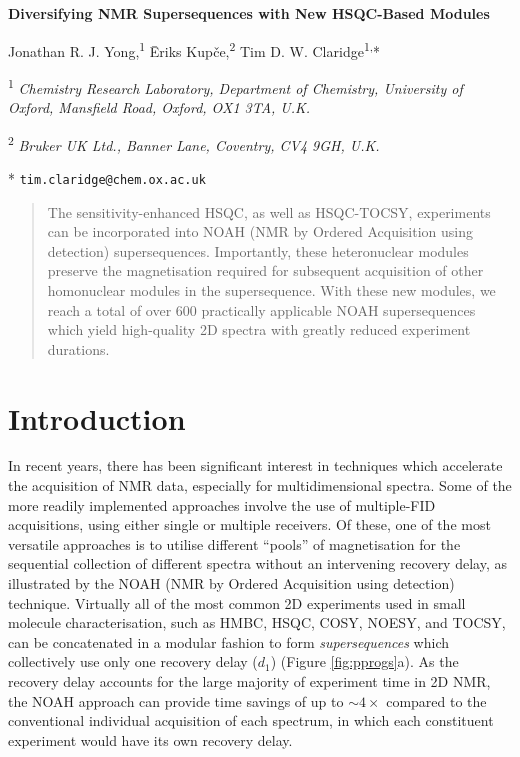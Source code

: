 \documentclass[11pt]{article}
\newcommand*{\proton}{\ce{^{1}H}}
\newcommand*{\figref}[1]{Figure \ref{fig:#1}}
\begin{document}
\begin{center}
    \Large \textbf{Diversifying NMR Supersequences with New HSQC-Based Modules}

    \vspace{0.2cm}

    \large Jonathan R. J. Yong,\textsuperscript{1} {\=E}riks Kup{\v{c}}e,\textsuperscript{2} Tim D. W. Claridge\textsuperscript{1,}*

    \vspace{0.2cm}

    \normalsize

    \textsuperscript{1} \textit{Chemistry Research Laboratory, Department of Chemistry, University of Oxford, Mansfield Road, Oxford, OX1 3TA, U.K.}

    \textsuperscript{2} \textit{Bruker UK Ltd., Banner Lane, Coventry, CV4 9GH, U.K.}

    * \texttt{tim.claridge@chem.ox.ac.uk}
\end{center}

\vspace{0.5cm}

\begin{abstract}
    The sensitivity-enhanced HSQC, as well as HSQC-TOCSY, experiments can be incorporated into NOAH (NMR by Ordered Acquisition using \proton{} detection) supersequences.
    Importantly, these heteronuclear modules preserve the magnetisation required for subsequent acquisition of other homonuclear modules in the supersequence.
    With these new modules, we reach a total of over 600 practically applicable NOAH supersequences which yield high-quality 2D spectra with greatly reduced experiment durations.
\end{abstract}

\section*{Introduction}

In recent years, there has been significant interest in techniques which accelerate the acquisition of NMR data, especially for multidimensional spectra.\autocite{ultrafast, timeshared, multireceive}
Some of the more readily implemented approaches involve the use of multiple-FID acquisitions, using either single or multiple receivers.
Of these, one of the most versatile approaches is to utilise different ``pools'' of magnetisation for the sequential collection of different spectra without an intervening recovery delay, as illustrated by the NOAH (NMR by Ordered Acquisition using \proton{} detection) technique.\autocite{noah}
Virtually all of the most common 2D experiments used in small molecule characterisation, such as HMBC, HSQC, COSY, NOESY, and TOCSY, can be concatenated in a modular fashion to form \textit{supersequences} which collectively use only one recovery delay ($d_1$) (\figref{pprogs}a).
As the recovery delay accounts for the large majority of experiment time in 2D NMR, the NOAH approach can provide time savings of up to $\sim 4\times$ compared to the conventional individual acquisition of each spectrum, in which each constituent experiment would have its own recovery delay.
\end{document}
